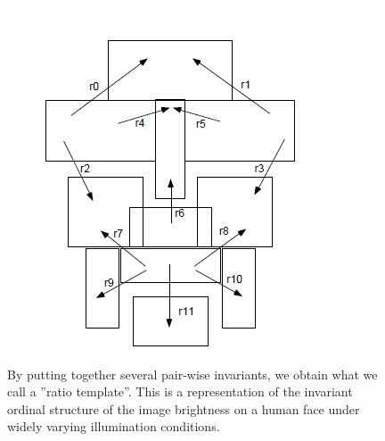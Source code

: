 \documentclass[a4paper,12pt]{article}
\begin{document}
\begin{figure}[hb]
  \centering
  \includegraphics[width=\textwidth, keepaspectratio=true]{face-ratio-template.jpg}
  \caption{By putting together several pair-wise invariants, we obtain what we call a 
  ''ratio template''. This is a representation of the invariant ordinal structure of the 
  image brightness on a human face under widely varying illumination conditions.\cite{Sinha:2002:QRR:648248.751730}}
 \label{fig:face-ratio-template}
\end{figure}

\clearpage
%




 


\end{document}
